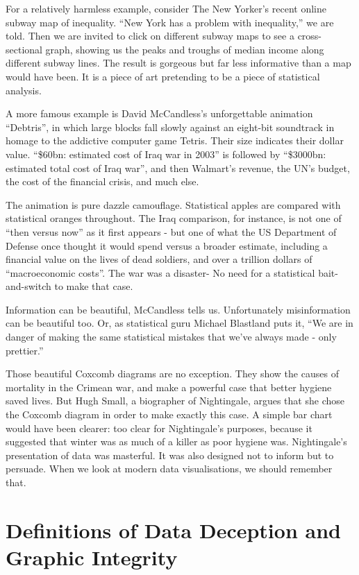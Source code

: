 \documentclass[]{book}
\theoremstyle{definition}
\theoremstyle{definition}
\theoremstyle{definition}
\theoremstyle{remark}
\begin{document}
For a relatively harmless example, consider The New Yorker's recent
online subway map of inequality. ``New York has a problem with
inequality,'' we are told. Then we are invited to click on different
subway maps to see a cross-sectional graph, showing us the peaks and
troughs of median income along different subway lines. The result is
gorgeous but far less informative than a map would have been. It is a
piece of art pretending to be a piece of statistical analysis.

A more famous example is David McCandless's unforgettable animation
``Debtris'', in which large blocks fall slowly against an eight-bit
soundtrack in homage to the addictive computer game Tetris. Their size
indicates their dollar value. ``\$60bn: estimated cost of Iraq war in
2003'' is followed by ``\$3000bn: estimated total cost of Iraq war'',
and then Walmart's revenue, the UN's budget, the cost of the financial
crisis, and much else.

The animation is pure dazzle camouflage. Statistical apples are compared
with statistical oranges throughout. The Iraq comparison, for instance,
is not one of ``then versus now'' as it first appears - but one of what
the US Department of Defense once thought it would spend versus a
broader estimate, including a financial value on the lives of dead
soldiers, and over a trillion dollars of ``macroeconomic costs''. The
war was a disaster- No need for a statistical bait-and-switch to make
that case.

Information can be beautiful, McCandless tells us. Unfortunately
misinformation can be beautiful too. Or, as statistical guru Michael
Blastland puts it, ``We are in danger of making the same statistical
mistakes that we've always made - only prettier.''

Those beautiful Coxcomb diagrams are no exception. They show the causes
of mortality in the Crimean war, and make a powerful case that better
hygiene saved lives. But Hugh Small, a biographer of Nightingale, argues
that she chose the Coxcomb diagram in order to make exactly this case. A
simple bar chart would have been clearer: too clear for Nightingale's
purposes, because it suggested that winter was as much of a killer as
poor hygiene was. Nightingale's presentation of data was masterful. It
was also designed not to inform but to persuade. When we look at modern
data visualisations, we should remember that.

\section{Definitions of Data Deception and Graphic
Integrity}\label{definitions-of-data-deception-and-graphic-integrity}
\end{document}
